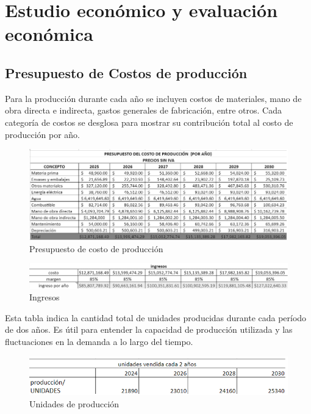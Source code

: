 \chapter{Estudio económico y evaluación económica}

\section{Presupuesto de Costos de producción}

Para la producción durante cada año se incluyen  costos de materiales, mano de obra directa e indirecta, gastos generales de fabricación, entre otros.
Cada categoría de costos se desglosa para mostrar su contribución total al costo de producción por año.

\begin{figure}[H]
    \centering	
    \includegraphics[width=.7\textwidth]{chapters/ELC_1.png} 
    \caption{Presupuesto de costo de producción}
\label{fig:macrolocalizacion}
\end{figure}


\begin{figure}[H]
    \centering	
    \includegraphics[width=.7\textwidth]{chapters/ELC_2.png} 
    \caption{Ingresos}
\label{fig:macrolocalizacion}
\end{figure}

Esta tabla indica la cantidad total de unidades producidas durante cada período de dos años. Es útil para entender la capacidad de producción utilizada y las fluctuaciones en la demanda a lo largo del tiempo.


\begin{figure}[H]
    \centering	
    \includegraphics[width=.5\textwidth]{chapters/ELC_3.png} 
    \caption{Unidades de producción}
\label{fig:macrolocalizacion}
\end{figure}

